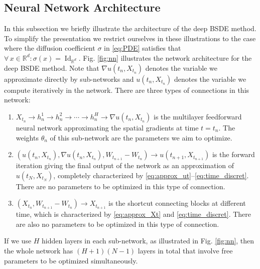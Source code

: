 \documentclass[11pt,english]{article}
\providecommand{\R}{{\ensuremath{\mathbb{R}}}}
\begin{document}
\subsection*{Neural Network Architecture}
In this subsection we briefly illustrate the architecture 
of the deep BSDE method.
To simplify the presentation we restrict ourselves in these illustrations 
to the case where the diffusion coefficient $ \sigma $ 
in \eqref{eq:PDE} satisfies that
$ \forall \, x \in \R^d \colon \sigma(x) = \operatorname{Id}_{ \R^d } $.
Fig. \ref{fig:nn} illustrates the network architecture for the deep BSDE method. Note that $\nabla u(t_n,X_{t_n})$ denotes the variable we approximate directly by sub-networks and $ u(t_n,X_{t_n})$ denotes the variable we compute iteratively in the network. There are three types of connections in this network:
\begin{enumerate}
  \item $X_{t_n}\to h_n^1 \rightarrow h_n^2 \rightarrow \cdots \rightarrow h_n^H \rightarrow \nabla u(t_n, X_{t_n})$ is the multilayer feedforward neural network approximating the spatial gradients at time $ t = t_n $. 
  The weights $\theta_n$ of this sub-network are the parameters we aim to optimize.

  \item $(u(t_n,X_{t_n}),\nabla u(t_n, X_{t_n}),W_{t_{n+1}}-W_{t_{n}})\rightarrow 
  u(t_{n+1},X_{t_{n+1}})$ is the forward iteration giving the final output of the network as an approximation of $u(t_N,X_{t_N})$, completely characterized by \eqref{eq:approx_ut}--\eqref{eq:time_discret}. There are no parameters to be optimized in this type of connection.

  \item $(X_{t_n},W_{t_{n+1}}-W_{t_{n}})\rightarrow X_{t_{n+1}}$ is the shortcut connecting blocks at different time, which is characterized by
  \eqref{eq:approx_Xt} and \eqref{eq:time_discret}.
   There are also no parameters to be optimized in this type of connection.
\end{enumerate}
If we use $H$ hidden layers in each sub-network, 
as illustrated in Fig. \ref{fig:nn}, then the whole network has 
$(H+1)(N-1)$ layers in total that involve free parameters to be optimized simultaneously. 
\end{document}
